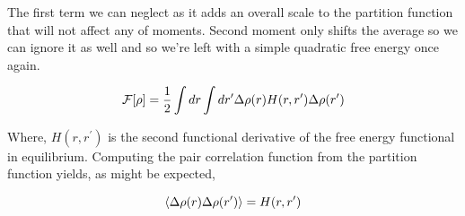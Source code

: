 The first term we can neglect as it adds an overall scale to the partition function that will not affect any of moments. Second moment only shifts the average so we can ignore it as well and so we're left with a simple quadratic free energy once again.

\begin{equation}
	\mathcal{F}[\rho] = \frac{1}{2}\int dr \int dr^\prime \Delta \rho(r) H(r, r^\prime) \Delta \rho(r^\prime)
\end{equation}

Where, $H(r, r^\prime)$ is the second functional derivative of the free energy functional in equilibrium. Computing the pair correlation function from the partition function yields, as might be expected,

\begin{equation}
	\left\langle \Delta\rho(r) \Delta\rho(r^\prime) \right\rangle = H(r, r^\prime)
\end{equation}
